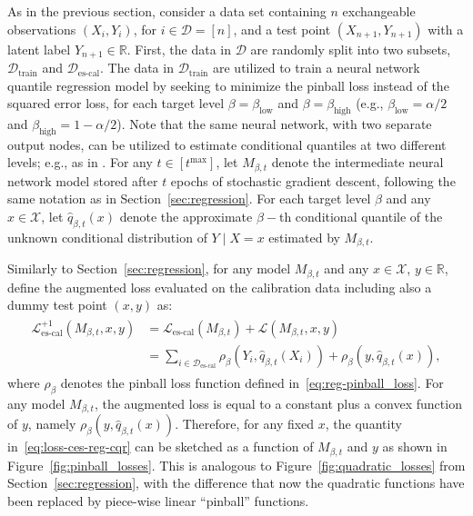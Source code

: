 As in the previous section, consider a data set containing $n$ exchangeable observations $(X_i,Y_i)$, for $i \in \mathcal{D} = [n]$, and a test point $(X_{n+1}, Y_{n+1})$ with a latent label $Y_{n+1} \in \mathbb{R}$. 
First, the data in $\mathcal{D}$ are randomly split into two subsets, $\mathcal{D}_{\text{train}}$ and $\mathcal{D}_{\text{es-cal}}$. The data in $\mathcal{D}_{\text{train}}$ are utilized to train a neural network quantile regression model \cite{taylor2000quantile} by seeking to minimize the pinball loss instead of the squared error loss, for each target level $\beta=\beta_{\text{low}}$ and $\beta=\beta_{\text{high}}$ (e.g., $\beta_{\text{low}} = \alpha/2$ and $\beta_{\text{high}}=1-\alpha/2$). Note that the same neural network, with two separate output nodes, can be utilized to estimate conditional quantiles at two different levels; e.g., as in \citet{romano2019conformalized}.
For any $t \in [t^{\text{max}}]$, let $M_{\beta, t}$ denote the intermediate neural network model stored after $t$ epochs of stochastic gradient descent, following the same notation as in Section~\ref{sec:regression}.
For each target level $\beta$ and any $x \in \mathcal{X}$, let $\hat{q}_{\beta, t}(x)$ denote the approximate $\beta-$th conditional quantile of the unknown conditional distribution of $Y \mid X=x$ estimated by $M_{\beta, t}$.


Similarly to Section~\ref{sec:regression}, for any model $M_{\beta, t}$ and any $x \in \mathcal{X}$, $y \in \mathbb{R}$, define the augmented loss evaluated on the calibration data including also a dummy test point $(x,y)$ as:
\begin{align}\label{eq:loss-ces-reg-cqr}
  \begin{split}
    \mathcal{L}_{\text{es-cal}}^{+1}(M_{\beta, t},x,y)
    & = \mathcal{L}_{\text{es-cal}}(M_{\beta, t}) + \mathcal{L}(M_{\beta, t}, x, y) \\
    & = \sum_{i \in \mathcal{D}_{\text{es-cal}}} \rho_\beta(Y_i, \hat{q}_{\beta, t}(X_i)) + \rho_\beta(y, \hat{q}_{\beta, t}(x)),
  \end{split}
\end{align}
where $\rho_\beta$ denotes the pinball loss function defined in~\eqref{eq:reg-pinball_loss}.
For any model $M_{\beta, t}$, the augmented loss is equal to a constant plus a convex function of $y$, namely $\rho_\beta(y, \hat{q}_{\beta, t}(x))$.
Therefore, for any fixed $x$, the quantity in~\eqref{eq:loss-ces-reg-cqr} can be sketched as a function of $M_{\beta, t}$ and $y$ as shown in Figure~\ref{fig:pinball_losses}. This is analogous to Figure~\ref{fig:quadratic_losses} from Section~\ref{sec:regression}, with the difference that now the quadratic functions have been replaced by piece-wise linear ``pinball'' functions.


